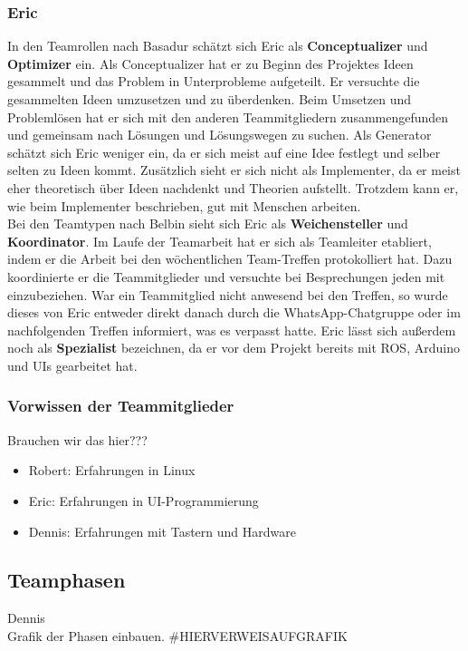 \documentclass[a4paper,12pt,headsepline]{scrartcl}
\begin{document}
		\subsubsection{Eric}
		In den Teamrollen nach Basadur schätzt sich Eric als \textbf{Conceptualizer} und \textbf{Optimizer} ein. Als Conceptualizer hat er zu Beginn des Projektes Ideen gesammelt und das Problem in Unterprobleme aufgeteilt. Er versuchte die gesammelten Ideen umzusetzen und zu überdenken. Beim Umsetzen und Problemlösen hat er sich mit den anderen Teammitgliedern zusammengefunden und gemeinsam nach Lösungen und Lösungswegen zu suchen. Als Generator schätzt sich Eric weniger ein, da er sich meist auf eine Idee festlegt und selber selten zu Ideen kommt. Zusätzlich sieht er sich nicht als Implementer, da er meist eher theoretisch über Ideen nachdenkt und Theorien aufstellt. Trotzdem kann er, wie beim Implementer beschrieben, gut mit Menschen arbeiten.\\
		Bei den Teamtypen nach Belbin sieht sich Eric als \textbf{Weichensteller} und \textbf{Koordinator}. Im Laufe der Teamarbeit hat er sich als Teamleiter etabliert, indem er die Arbeit bei den wöchentlichen Team-Treffen protokolliert hat. Dazu koordinierte er die Teammitglieder und versuchte bei Besprechungen jeden mit einzubeziehen. War ein Teammitglied nicht anwesend bei den Treffen, so wurde dieses von Eric entweder direkt danach durch die WhatsApp-Chatgruppe oder im nachfolgenden Treffen informiert, was es verpasst hatte. Eric lässt sich außerdem noch als \textbf{Spezialist} bezeichnen, da er vor dem Projekt bereits mit ROS, Arduino und UIs gearbeitet hat.\\
		
	\subsubsection{Vorwissen der Teammitglieder}
		Brauchen wir das hier???
		\begin{itemize}
			\item Robert: Erfahrungen in Linux
			\item Eric: Erfahrungen in UI-Programmierung
			\item Dennis: Erfahrungen mit Tastern und Hardware
		\end{itemize}
	\subsection{Teamphasen}
		Dennis\\
		Grafik der Phasen einbauen. {#HIERVERWEISAUFGRAFIK}
\end{document}
